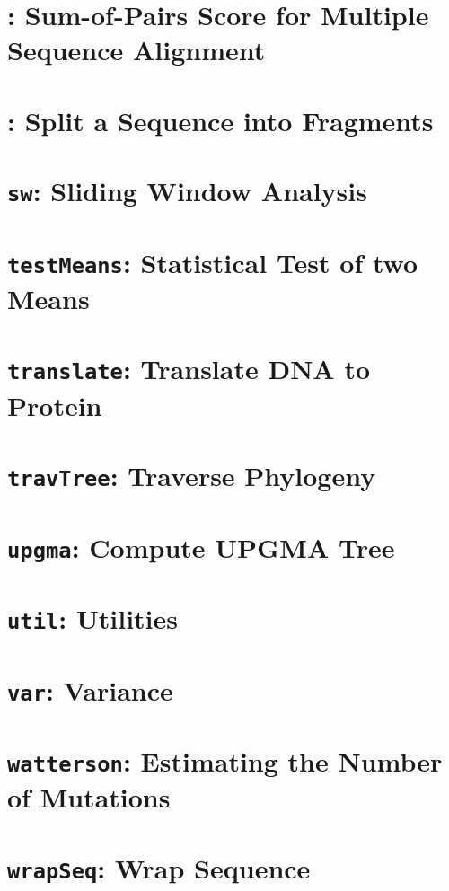 \documentclass[a4paper]{book}
\begin{document}
\chapter{: Sum-of-Pairs Score for Multiple Sequence
  Alignment}\label{ch:sops}

\chapter{: Split a Sequence into Fragments}\label{ch:ss}

\chapter{\texttt{sw}: Sliding Window Analysis}\label{ch:sw}

\chapter{\texttt{testMeans}: Statistical Test of two Means}\label{ch:tm}

\chapter{\texttt{translate}: Translate DNA to
  Protein}\label{ch:tr}

\chapter{\texttt{travTree}: Traverse Phylogeny}\label{ch:tt}

\chapter{\texttt{upgma}: Compute UPGMA Tree}\label{ch:upgma}

\chapter{\texttt{util}: Utilities}\label{ch:uti}

\chapter{\texttt{var}: Variance}\label{ch:var}

\chapter{\texttt{watterson}: Estimating the Number of Mutations}\label{ch:wat}

\chapter{\texttt{wrapSeq}: Wrap Sequence}\label{ch:wra}



\end{document}
